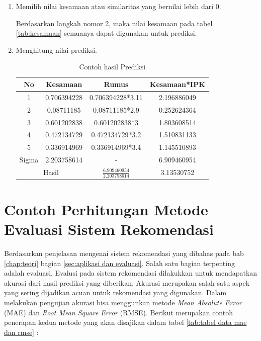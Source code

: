 \begin{enumerate}
    \item Memilih nilai kesamaan atau similaritas yang bernilai lebih dari 0.
    
    Berdasarkan langkah nomor 2, maka nilai kesamaan pada tabel \ref{tab:kesamaan} semuanya dapat digunakan untuk prediksi.
    
    \item Menghitung nilai prediksi.
    
    \begin{table}[H]
        \centering
        \renewcommand{\arraystretch}{1.5}
        \begin{tabular}{|c|c|c|c|}
            \hline
            No & Kesamaan & Rumus & Kesamaan*IPK \\
            \hline
            1 & 0.706394228 & 0.706394228*3.11 & 2.196886049 \\
            \hline
            2 & 0.08711185 & 0.08711185*2.9 &  0.252624364 \\
            \hline
            3 & 0.601202838 & 0.601202838*3 & 1.803608514 \\
            \hline
            4 & 0.472134729 & 0.472134729*3.2 & 1.510831133 \\
            \hline
            5 & 0.336914969 & 0.336914969*3.4 & 1.145510893 \\
            \hline
            Sigma & 2.203758614 & - & 6.909460954 \\
            \hline
            \multicolumn{2}{|c|}{Hasil} & $\frac{6.909460954}{2.203758614}$ & 3.13530752\\
            \hline
        \end{tabular}
        \caption{Contoh hasil Prediksi}
        \label{tab:prediksi}
    \end{table}
\end{enumerate}

\section{Contoh Perhitungan Metode Evaluasi Sistem Rekomendasi}
\label{sec:contoh perhitungan evaluasi}

Berdasarkan penjelasan mengenai sistem rekomendasi yang dibahas pada bab \ref{chap:teori} bagian \ref{sec:aplikasi dan evaluasi}. Salah satu bagian terpenting adalah evaluasi. Evalusi pada sistem rekomendasi dilakukkan untuk mendapatkan akurasi dari hasil prediksi yang diberikan. Akurasi merupakan salah satu aspek yang sering dijadikan acuan untuk rekomendasi yang digunakan. Dalam melakukan pengujian akurasi bisa menggunkan metode \textit{Mean Absolute Error} (MAE) dan \textit{Root Mean Square Error} (RMSE). Berikut merupakan contoh penerapan kedua metode yang akan disajikan dalam tabel \ref{tab:tabel data mae dan rmse} :

